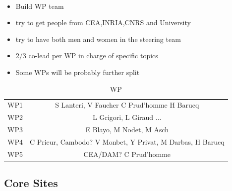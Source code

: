 \begin{frame}[fragile=singleslide]{\insertsectionhead}
  \framesubtitle{\insertsubsectionhead}
  \begin{itemize}
      \item Build WP team
      \item try to get people from CEA,INRIA,CNRS and University
      \item try to have both men and women in the steering team
      \item 2/3 co-lead per WP in charge of specific topics
      \item Some WPs will be probably further split
  \end{itemize}
  \begin{table}[]
      \centering
      \begin{tabular}{c|c}
          WP1 &  S Lanteri, V Faucher C Prud'homme H Barucq\\
          WP2&  L Grigori, L Giraud ...\\
          WP3& E Blayo, M Nodet, M Asch \\
          WP4& C Prieur, Cambodo? V Monbet, Y Privat, M Darbas, H Barucq \\
          WP5 & CEA/DAM? C Prud'homme
      \end{tabular}
      \caption{WP}
      \label{tab:my_label}
  \end{table}

\end{frame}

\subsection{Core Sites}

